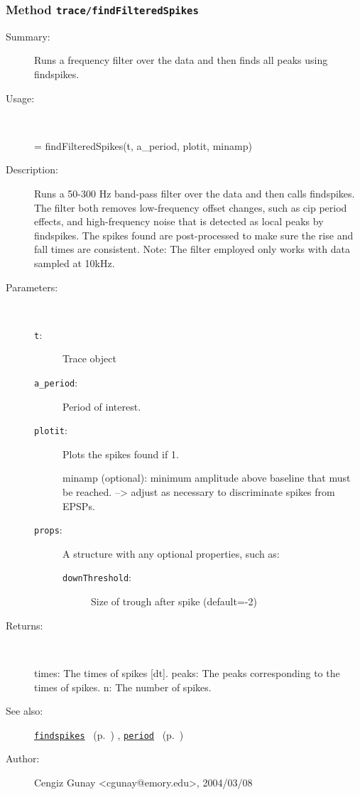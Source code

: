\subsubsection[Method \texttt{findFilteredSpikes}]{Method \texttt{trace/findFilteredSpikes}}%
%
\label{ref_trace__findFilteredSpikes}%
\hypertarget{ref_trace__findFilteredSpikes}{}%
\begin{description}
\item[Summary:]Runs a frequency filter over the data and then finds all peaks using findspikes.
%
\item[Usage:]~%
\begin{lyxcode}%
[times, peaks, n] = 
	findFilteredSpikes(t, a\_period, plotit, minamp)
%
\end{lyxcode}%
%
\item[Description:]%
Runs a 50-300 Hz band-pass filter over the data and then calls findspikes.
   The filter both removes low-frequency offset changes, such as 
   cip period effects, and high-frequency noise that is detected 
   as local peaks by findspikes. The spikes found are 
   post-processed to make sure the rise and fall times are consistent.
   Note: The filter employed only works with data sampled at 10kHz.
\item[Parameters:]~
\begin{description}%
\item[\texttt{t}:]
 Trace object
\item[\texttt{a\_period}:]
 Period of interest.
\item[\texttt{plotit}:]
 Plots the spikes found if 1.

minamp (optional): minimum amplitude above baseline that must be reached.
--> adjust as necessary to discriminate spikes from EPSPs.
\item[\texttt{props}:]
 A structure with any optional properties, such as:
\begin{description}%
\item[\texttt{downThreshold}:]
 Size of trough after spike (default=-2)
\end{description}%
\end{description}%
%
\item[Returns:
]~

   times: The times of spikes [dt].
   peaks: The peaks corresponding to the times of spikes.
   n: The number of spikes.
%
%
\item[See also:]%
\hyperlink{ref_findspikes}{\texttt{findspikes}}%
\ (p.~\pageref{ref_findspikes})%
%
, \hyperlink{ref_period}{\texttt{period}}%
\ (p.~\pageref{ref_period})%
%
%
\item[Author:]%
Cengiz Gunay <cgunay@emory.edu>, 2004/03/08
%
\end{description}
\methodline%
